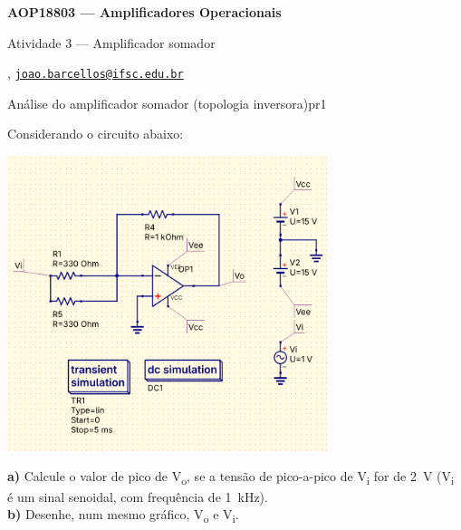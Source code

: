 



\usepackage[style=numeric, citestyle=ieee]{biblatex}




\begin{Large}
    \textbf{AOP18803 --- Amplificadores Operacionais}
    
    Atividade 3 --- Amplificador somador \hfill {}
\end{Large}

\vspace{1ex}
\textbf{} , \href{mailto:joao.barcellos@ifsc.edu.br}{\texttt{joao.barcellos@ifsc.edu.br}}\\
\textbf{}

\vspace{2ex}

\begin{problem}{Análise do amplificador somador (topologia inversora)}{pr1}

Considerando o circuito abaixo: \\
    
\begin{center}
    \includegraphics[width=0.7\textwidth]{./figures/sum_opamp.png}
\end{center}

\textbf{a)} Calcule o valor de pico de V\textsubscript{o}, se a tensão de pico-a-pico de V\textsubscript{i} for de \SI{2}{\volt} (V\textsubscript{i} é um sinal senoidal, com frequência de \SI{1}{\kilo\hertz}). \\

\textbf{b)} Desenhe, num mesmo gráfico, V\textsubscript{o} e V\textsubscript{i}. \\

\end{problem}

